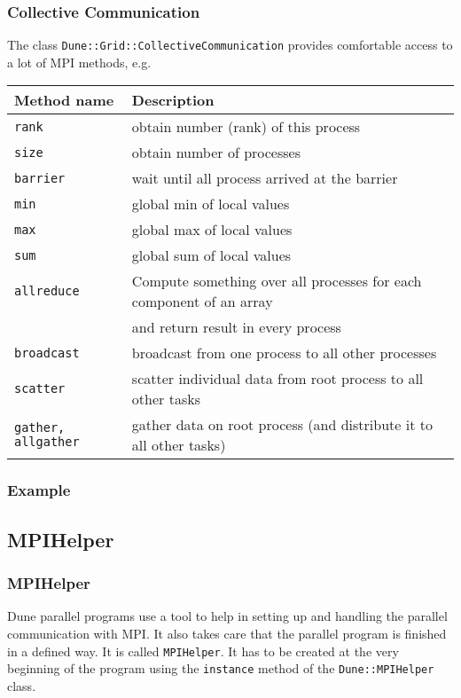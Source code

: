 \begin{frame}[fragile]
  \frametitle<presentation>{Collective Communication}
The class  \lstinline!Dune::Grid::CollectiveCommunication! provides comfortable access to a lot of MPI methods, e.g.\medskip

    \begin{tabular}{l|p{7cm}}
      \hline
      Method name & Description\\\hline
      \lstinline!rank! & obtain number (rank) of this process\\
      \lstinline!size! & obtain number of processes \\
      \lstinline!barrier! & wait until all process arrived at the barrier\\
      \lstinline!min! & global min of local values\\
      \lstinline!max! & global max of local values\\
      \lstinline!sum! & global sum of local values\\
      \lstinline!allreduce! & Compute something over all processes for each component of an array \\
      &and return result in every process\\
      \lstinline!broadcast! & broadcast from one process to all other processes\\
      \lstinline!scatter! & scatter individual data from root process to all other tasks\\
      \lstinline!gather, allgather! & gather data on root process (and distribute it to all other tasks)\\
      \hline
    \end{tabular}

\end{frame}

\begin{frame}
  \frametitle{Example}

\end{frame}

\subsection{MPIHelper}
\begin{frame}[fragile]
  \frametitle<presentation>{MPIHelper}
  Dune parallel programs use a tool to help in setting up and handling the
parallel communication with MPI. It also takes care that the parallel program
is finished in a defined way. It is called \lstinline!MPIHelper!. It has to be
created at the very beginning of the program
using the \lstinline!instance! method of the \lstinline!Dune::MPIHelper! class.


\end{frame}

